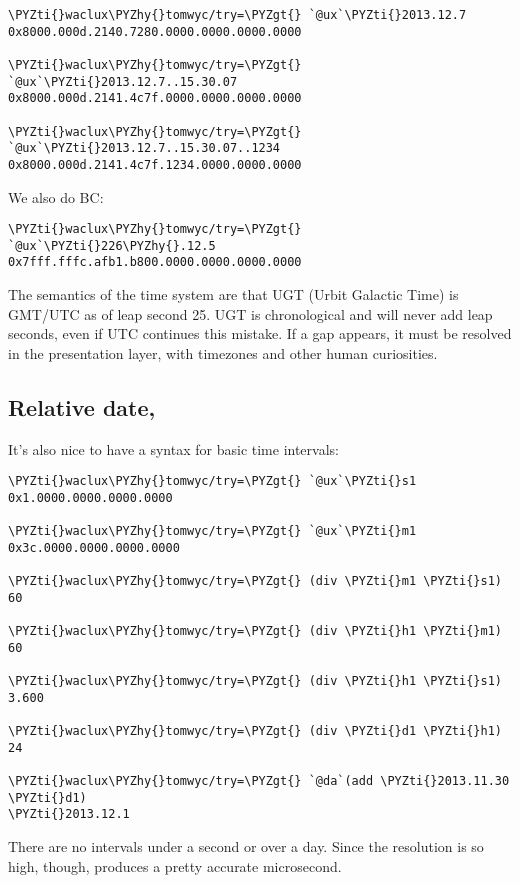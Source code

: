 \begin{framed_shaded}
\begin{Verbatim}[fontsize=\relsize{-2.5},fontseries=b,commandchars=\\\{\}]
\PYZti{}waclux\PYZhy{}tomwyc/try=\PYZgt{} `@ux`\PYZti{}2013.12.7
0x8000.000d.2140.7280.0000.0000.0000.0000

\PYZti{}waclux\PYZhy{}tomwyc/try=\PYZgt{} `@ux`\PYZti{}2013.12.7..15.30.07
0x8000.000d.2141.4c7f.0000.0000.0000.0000

\PYZti{}waclux\PYZhy{}tomwyc/try=\PYZgt{} `@ux`\PYZti{}2013.12.7..15.30.07..1234
0x8000.000d.2141.4c7f.1234.0000.0000.0000
\end{Verbatim}
\end{framed_shaded}
We also do BC:

\begin{framed_shaded}
\begin{Verbatim}[fontsize=\relsize{-2.5},fontseries=b,commandchars=\\\{\}]
\PYZti{}waclux\PYZhy{}tomwyc/try=\PYZgt{} `@ux`\PYZti{}226\PYZhy{}.12.5
0x7fff.fffc.afb1.b800.0000.0000.0000.0000
\end{Verbatim}
\end{framed_shaded}
The semantics of the time system are that UGT (Urbit Galactic
Time) is GMT/UTC as of leap second 25.  UGT is chronological and
will never add leap seconds, even if UTC continues this mistake.
If a gap appears, it must be resolved in the presentation layer, 
with timezones and other human curiosities.

\subsection{Relative date, }

It's also nice to have a syntax for basic time intervals:

\begin{framed_shaded}
\begin{Verbatim}[fontsize=\relsize{-2.5},fontseries=b,commandchars=\\\{\}]
\PYZti{}waclux\PYZhy{}tomwyc/try=\PYZgt{} `@ux`\PYZti{}s1
0x1.0000.0000.0000.0000

\PYZti{}waclux\PYZhy{}tomwyc/try=\PYZgt{} `@ux`\PYZti{}m1
0x3c.0000.0000.0000.0000

\PYZti{}waclux\PYZhy{}tomwyc/try=\PYZgt{} (div \PYZti{}m1 \PYZti{}s1)
60
  
\PYZti{}waclux\PYZhy{}tomwyc/try=\PYZgt{} (div \PYZti{}h1 \PYZti{}m1)
60

\PYZti{}waclux\PYZhy{}tomwyc/try=\PYZgt{} (div \PYZti{}h1 \PYZti{}s1)
3.600

\PYZti{}waclux\PYZhy{}tomwyc/try=\PYZgt{} (div \PYZti{}d1 \PYZti{}h1)
24

\PYZti{}waclux\PYZhy{}tomwyc/try=\PYZgt{} `@da`(add \PYZti{}2013.11.30 \PYZti{}d1)
\PYZti{}2013.12.1
\end{Verbatim}
\end{framed_shaded}
There are no  intervals under a second or over a day.  Since
the resolution is so high, though,  produces
a pretty accurate microsecond.

